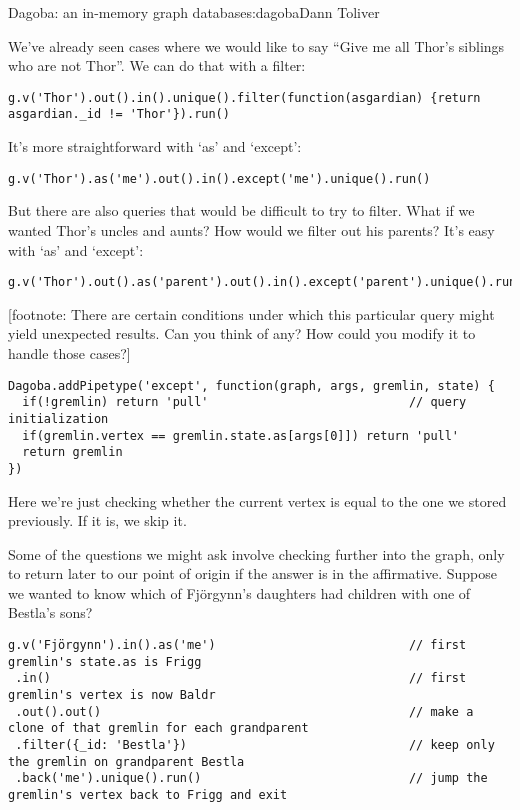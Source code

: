 \begin{aosachapter}{Dagoba: an in-memory graph database}{s:dagoba}{Dann Toliver}
\label{except}

We've already seen cases where we would like to say ``Give me all Thor's
siblings who are not Thor''. We can do that with a filter:

\begin{verbatim}
g.v('Thor').out().in().unique().filter(function(asgardian) {return asgardian._id != 'Thor'}).run()
\end{verbatim}

It's more straightforward with `as' and `except':

\begin{verbatim}
g.v('Thor').as('me').out().in().except('me').unique().run()
\end{verbatim}

But there are also queries that would be difficult to try to filter.
What if we wanted Thor's uncles and aunts? How would we filter out his
parents? It's easy with `as' and `except':

\begin{verbatim}
g.v('Thor').out().as('parent').out().in().except('parent').unique().run()
\end{verbatim}

{[}footnote: There are certain conditions under which this particular
query might yield unexpected results. Can you think of any? How could
you modify it to handle those cases?{]}

\begin{verbatim}
Dagoba.addPipetype('except', function(graph, args, gremlin, state) {
  if(!gremlin) return 'pull'                            // query initialization
  if(gremlin.vertex == gremlin.state.as[args[0]]) return 'pull'
  return gremlin
})
\end{verbatim}

Here we're just checking whether the current vertex is equal to the one
we stored previously. If it is, we skip it.

\label{back}

Some of the questions we might ask involve checking further into the
graph, only to return later to our point of origin if the answer is in
the affirmative. Suppose we wanted to know which of Fjörgynn's daughters
had children with one of Bestla's sons?

\begin{verbatim}
g.v('Fjörgynn').in().as('me')                           // first gremlin's state.as is Frigg
 .in()                                                  // first gremlin's vertex is now Baldr
 .out().out()                                           // make a clone of that gremlin for each grandparent
 .filter({_id: 'Bestla'})                               // keep only the gremlin on grandparent Bestla
 .back('me').unique().run()                             // jump the gremlin's vertex back to Frigg and exit
\end{verbatim}


\end{aosachapter}
